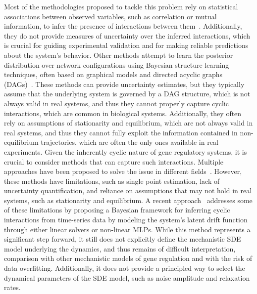 \documentclass[10pt, aps, rmp,  twocolumn, superscriptaddress, floatfix, showkeys]{revtex4-2}
\begin{document}
Most of the methodologies proposed to tackle this problem rely on statistical associations between observed variables, such as correlation or mutual information, to infer the presence of interactions between them~\cite{margolin2006aracne,marbach2012wisdom, marku2023time}. Additionally, they do not provide measures of uncertainty over the inferred interactions, which is crucial for guiding experimental validation and for making reliable predictions about the system's behavior. 
Other methods attempt to learn the posterior distribution over network configurations using Bayesian structure learning techniques, often based on graphical models and directed acyclic graphs (DAGs)~\cite{glymour2019review}. These methods can provide uncertainty estimates, but they typically assume that the underlying system is governed by a DAG structure, which is not always valid in real systems, and thus they cannot properly capture cyclic interactions, which are common in biological systems. Additionally, they often rely on assumptions of stationarity and equilibrium, which are not always valid in real systems, and thus they cannot fully exploit the information contained in non-equilibrium trajectories, which are often the only ones available in real experiments.
Given the inherently cyclic nature of gene regulatory systems, it is crucial to consider methods that can capture such interactions. Multiple approaches have been proposed to solve the issue in different fields~\cite{huang2020causal,runge2019detecting}. However, these methods have limitations, such as single point estimation, lack of uncertainty quantification, and reliance on assumptions that may not hold in real systems, such as stationarity and equilibrium.
A recent approach~\cite{atanackovic2023dyngfn} addresses some of these limitations by proposing a Bayesian framework for inferring cyclic interactions from time-series data by modeling the system's latent drift function through either linear solvers or non-linear MLPs. While this method represents a significant step forward, it still does not explicitly define the mechanistic SDE model underlying the dynamics, and thus remains of difficult interpretation, comparison with other mechanistic models of gene regulation and with the risk of data overfitting. Additionally, it does not provide a principled way to select the dynamical parameters of the SDE model, such as noise amplitude and relaxation rates.
\end{document}
